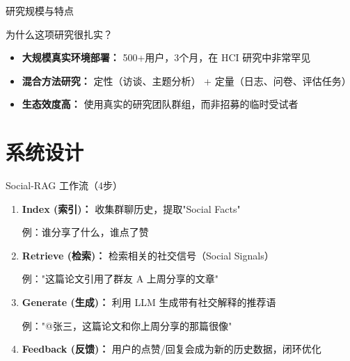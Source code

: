 \documentclass[UTF8,aspectratio=169]{ctexbeamer}
\begin{document}
\begin{frame}{研究规模与特点}
\begin{block}{为什么这项研究很扎实？}
\begin{itemize}
\item \textbf{大规模真实环境部署：} 500+用户，3个月，在 HCI 研究中非常罕见
\item \textbf{混合方法研究：} 定性（访谈、主题分析） + 定量（日志、问卷、评估任务）
\item \textbf{生态效度高：} 使用真实的研究团队群组，而非招募的临时受试者
\end{itemize}
\end{block}
\end{frame}

\section{系统设计}

\begin{frame}{Social-RAG 工作流（4步）}
\begin{enumerate}
\item \textbf{Index (索引)：} 收集群聊历史，提取"Social Facts"

  例：谁分享了什么，谁点了赞

\vspace{0.3cm}

\item \textbf{Retrieve (检索)：} 检索相关的社交信号（Social Signals）

  例："这篇论文引用了群友 A 上周分享的文章"

\vspace{0.3cm}

\item \textbf{Generate (生成)：} 利用 LLM 生成带有\textcolor{myblue}{社交解释}的推荐语

  例："@张三，这篇论文和你上周分享的那篇很像"

\vspace{0.3cm}

\item \textbf{Feedback (反馈)：} 用户的点赞/回复会成为新的历史数据，闭环优化
\end{enumerate}
\end{frame}
\end{document}
